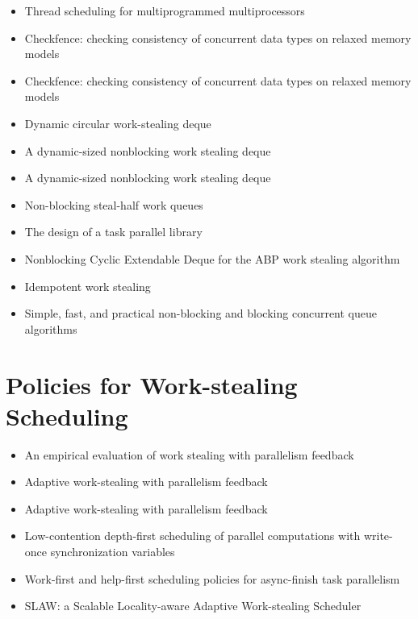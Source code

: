 \begin{itemize}
\item Thread scheduling for multiprogrammed multiprocessors
  \cite{Arora2001}
\item Checkfence: checking consistency of concurrent data types on
  relaxed memory models \cite{Burckhardt2007}
\item Checkfence: checking consistency of concurrent data types on
  relaxed memory models \cite{Burckhardt2007a}
\item Dynamic circular work-stealing deque \cite{Chase2005}
\item A dynamic-sized nonblocking work stealing deque
  \cite{Hendler2006}
\item A dynamic-sized nonblocking work stealing deque
  \cite{Hendler2006a}
\item Non-blocking steal-half work queues \cite{Hendler2002}
\item The design of a task parallel library \cite{Leijen2009}
\item Nonblocking Cyclic Extendable Deque for the ABP work stealing
  algorithm \cite{Lev2005}
\item Idempotent work stealing \cite{Michael2009}
\item Simple, fast, and practical non-blocking and blocking concurrent
  queue algorithms \cite{Michael1996}
\end{itemize}


\section{Policies for Work-stealing Scheduling}
\label{sec:lr-policies-for-work-stealing-scheduling}

\begin{itemize}
\item An empirical evaluation of work stealing with parallelism
  feedback \cite{Agrawal2006}
\item Adaptive work-stealing with parallelism feedback
  \cite{Agrawal2008}
\item Adaptive work-stealing with parallelism feedback
  \cite{Agrawal2008a}
\item Low-contention depth-first scheduling of parallel computations
  with write-once synchronization variables \cite{Fatourou2001}
\item Work-first and help-first scheduling policies for async-finish
  task parallelism \cite{Guo2009}
\item SLAW: a Scalable Locality-aware Adaptive Work-stealing Scheduler
  \cite{Guo2010}
\end{itemize}


